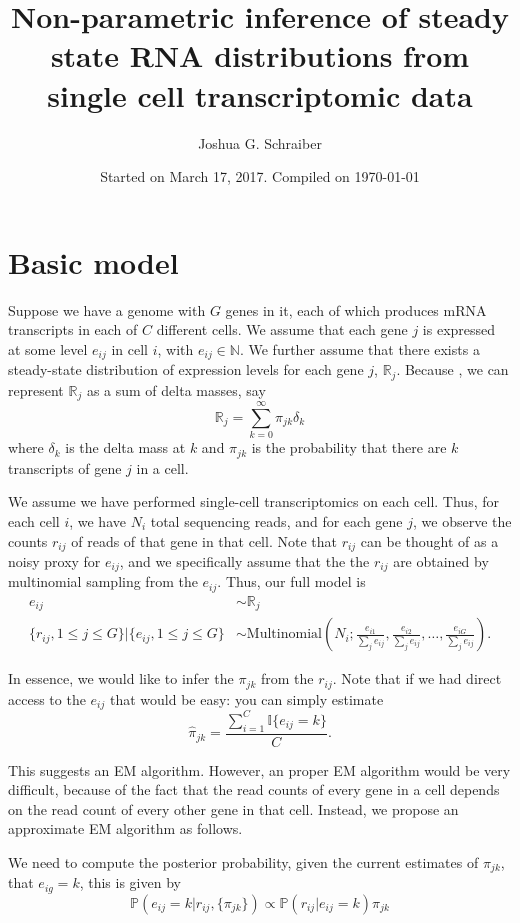 \documentclass[11pt, oneside]{article}   	%
\title{Non-parametric inference of steady state RNA distributions from single cell transcriptomic data}
\author{Joshua G. Schraiber}
\date{Started on March 17, 2017. Compiled on \today}							%
\begin{document}
\maketitle
\section{Basic model}
Suppose we have a genome with $G$ genes in it, each of which produces mRNA transcripts in each of $C$ different cells. We assume that each gene $j$ is expressed at some level $e_{ij}$ in cell $i$, with $e_{ij} \in \mathbb{N}$. We further assume that there exists a steady-state distribution of expression levels for each gene $j$, $\mathbb{R}_j$. Because , we can represent $\mathbb{R}_j$ as a sum of delta masses, say
\[
\mathbb{R}_j = \sum_{k=0}^\infty \pi_{jk}\delta_k
\]
where $\delta_k$ is the delta mass at $k$ and $\pi_{jk}$ is the probability that there are $k$ transcripts of gene $j$ in a cell.

We assume we have performed single-cell transcriptomics on each cell. Thus, for each cell $i$, we have $N_i$ total sequencing reads, and for each gene $j$, we observe the counts $r_{ij}$ of reads of that gene in that cell. Note that $r_{ij}$ can be thought of as a noisy proxy for $e_{ij}$, and we specifically assume that the the $r_{ij}$ are obtained by multinomial sampling from the $e_{ij}$. Thus, our full model is
\begin{align*}
e_{ij} &\sim \mathbb{R}_j \\
\{r_{ij}, 1 \leq j \leq G\} | \{e_{ij}, 1 \leq j \leq G\} &\sim \text{Multinomial}\left(N_i; \frac{e_{i1}}{\sum_j{e_{ij}}},\frac{e_{i2}}{\sum_j{e_{ij}}},\ldots, \frac{e_{iG}}{\sum_j{e_{ij}}}\right).
\end{align*}

In essence, we would like to infer the $\pi_{jk}$ from the $r_{ij}$. Note that if we had direct access to the $e_{ij}$ that would be easy: you can simply estimate
\[
\hat{\pi}_{jk} = \frac{\sum_{i=1}^C \mathbb{I}\{e_{ij} = k\}}{C}.
\]

This suggests an EM algorithm. However, an proper EM algorithm would be very difficult, because of the fact that the read counts of every gene in a cell depends on the read count of every other gene in that cell. Instead, we propose an approximate EM algorithm as follows.

We need to compute the posterior probability, given the current estimates of $\pi_{jk}$, that $e_{ig} = k$, this is given by
\[
\mathbb{P}(e_{ij} = k | r_{ij}, \{\pi_{jk}\}) \propto \mathbb{P}(r_{ij} | e_{ij} = k)\pi_{jk}
\]
\end{document}
